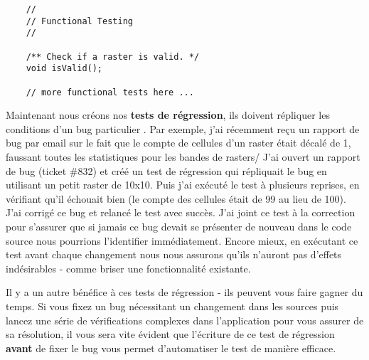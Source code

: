 \begin{verbatim}
    //
    // Functional Testing
    //
    
    /** Check if a raster is valid. */
    void isValid();

    // more functional tests here ...
\end{verbatim}

Maintenant nous créons nos \textbf{tests de régression}, ils doivent répliquer les conditions d'un bug particulier . Par exemple, j'ai récemment reçu un rapport de bug par email sur le fait que le compte de cellules d'un raster était décalé de 1, faussant toutes les statistiques pour les bandes de rasters/ J'ai ouvert un rapport de bug (ticket \#832) et créé un test de régression qui répliquait le bug en utilisant un petit raster de 10x10. Puis j'ai exécuté le test à plusieurs reprises, en vérifiant qu'il échouait bien (le compte des cellules était de 99 au lieu de 100). J'ai corrigé ce bug et relancé le test avec succès. J'ai joint ce test à la correction pour s'assurer que si jamais ce bug devait se présenter de nouveau dans le code source nous pourrions l'identifier immédiatement. Encore mieux, en exécutant ce test avant chaque changement nous nous assurons qu'ils n'auront pas d'effets indésirables - comme briser une fonctionnalité existante.

Il y a un autre bénéfice à  ces tests de régression - ils peuvent vous faire gagner du temps. Si vous fixez un bug nécessitant un changement dans les sources puis lancez une série de vérifications complexes dans l'application pour vous assurer de sa résolution, il vous sera vite évident que l'écriture de ce test de régression \textbf{avant} de fixer le bug vous permet d'automatiser le test de manière efficace.

